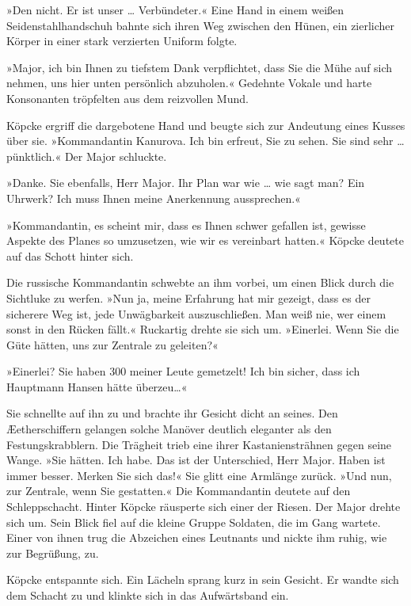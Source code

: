 »Den nicht. Er ist unser … Verbündeter.« Eine Hand in einem weißen
Seidenstahlhandschuh bahnte sich ihren Weg zwischen den Hünen, ein
zierlicher Körper in einer stark verzierten Uniform folgte.

»Major, ich bin Ihnen zu tiefstem Dank verpflichtet, dass Sie die
Mühe auf sich nehmen, uns hier unten persönlich abzuholen.«
Gedehnte Vokale und harte Konsonanten tröpfelten aus dem reizvollen
Mund.

Köpcke ergriff die dargebotene Hand und beugte sich zur Andeutung
eines Kusses über sie. »Kommandantin Kanurova. Ich bin erfreut, Sie
zu sehen. Sie sind sehr … pünktlich.« Der Major schluckte.

»Danke. Sie ebenfalls, Herr Major. Ihr Plan war wie … wie sagt man?
Ein Uhrwerk? Ich muss Ihnen meine Anerkennung aussprechen.«

»Kommandantin, es scheint mir, dass es Ihnen schwer gefallen ist,
gewisse Aspekte des Planes so umzusetzen, wie wir es vereinbart
hatten.« Köpcke deutete auf das Schott hinter sich.

Die russische Kommandantin schwebte an ihm vorbei, um einen Blick
durch die Sichtluke zu werfen. »Nun ja, meine Erfahrung hat mir
gezeigt, dass es der sicherere Weg ist, jede Unwägbarkeit
auszuschließen. Man weiß nie, wer einem sonst in den Rücken fällt.«
Ruckartig drehte sie sich um. »Einerlei. Wenn Sie die Güte hätten,
uns zur Zentrale zu geleiten?«

»Einerlei? Sie haben 300 meiner Leute gemetzelt! Ich bin sicher,
dass ich Hauptmann Hansen hätte überzeu…«

Sie schnellte auf ihn zu und brachte ihr Gesicht dicht an seines.
Den Æetherschiffern gelangen solche Manöver deutlich eleganter als
den Festungskrabblern. Die Trägheit trieb eine ihrer
Kastaniensträhnen gegen seine Wange. »Sie hätten. Ich habe. Das ist
der Unterschied, Herr Major. Haben ist immer besser. Merken Sie
sich das!« Sie glitt eine Armlänge zurück. »Und nun, zur Zentrale,
wenn Sie gestatten.« Die Kommandantin deutete auf den
Schleppschacht. Hinter Köpcke räusperte sich einer der Riesen. Der
Major drehte sich um. Sein Blick fiel auf die kleine Gruppe
Soldaten, die im Gang wartete. Einer von ihnen trug die Abzeichen
eines Leutnants und nickte ihm ruhig, wie zur Begrüßung, zu.

Köpcke entspannte sich. Ein Lächeln sprang kurz in sein Gesicht. Er
wandte sich dem Schacht zu und klinkte sich in das Aufwärtsband
ein.

\tb

